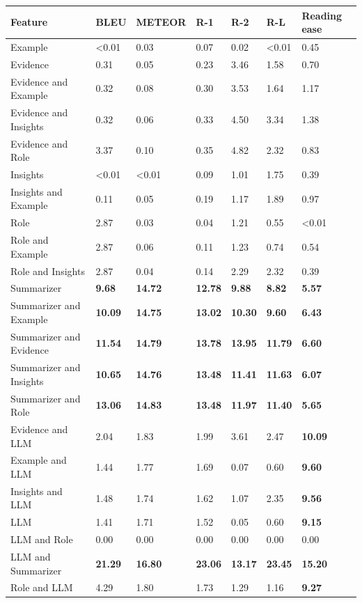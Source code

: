\begin{tabular}{|l|l|l|l|l|l|l|}
\hline
\textbf{Feature} & BLEU & METEOR & R-1 & R-2 & R-L & Reading ease \\
 \hline
 Example & \textless{}0.01 & 0.03 & 0.07 & 0.02 & \textless{}0.01 & 0.45 \\
 \hline
 Evidence & 0.31 & 0.05 & 0.23 & 3.46 & 1.58 & 0.70 \\
 \hline
 Evidence and Example & 0.32 & 0.08 & 0.30 & 3.53 & 1.64 & 1.17 \\
 \hline
 Evidence and Insights & 0.32 & 0.06 & 0.33 & 4.50 & 3.34 & 1.38 \\
 \hline
 Evidence and Role & 3.37 & 0.10 & 0.35 & 4.82 & 2.32 & 0.83 \\
 \hline
 Insights & \textless{}0.01 & \textless{}0.01 & 0.09 & 1.01 & 1.75 & 0.39 \\
 \hline
 Insights and Example & 0.11 & 0.05 & 0.19 & 1.17 & 1.89 & 0.97 \\
 \hline
 Role & 2.87 & 0.03 & 0.04 & 1.21 & 0.55 & \textless{}0.01 \\
 \hline
 Role and Example & 2.87 & 0.06 & 0.11 & 1.23 & 0.74 & 0.54 \\
 \hline
 Role and Insights & 2.87 & 0.04 & 0.14 & 2.29 & 2.32 & 0.39 \\
 \hline
 Summarizer & \textbf{9.68} & \textbf{14.72} & \textbf{12.78} & \textbf{9.88} & \textbf{8.82} & \textbf{5.57} \\
 \hline
 Summarizer and Example & \textbf{10.09} & \textbf{14.75} & \textbf{13.02} & \textbf{10.30} & \textbf{9.60} & \textbf{6.43} \\
 \hline
 Summarizer and Evidence & \textbf{11.54} & \textbf{14.79} & \textbf{13.78} & \textbf{13.95} & \textbf{11.79} & \textbf{6.60} \\
 \hline
 Summarizer and Insights & \textbf{10.65} & \textbf{14.76} & \textbf{13.48} & \textbf{11.41} & \textbf{11.63} & \textbf{6.07} \\
 \hline
 Summarizer and Role & \textbf{13.06} & \textbf{14.83} & \textbf{13.48} & \textbf{11.97} & \textbf{11.40} & \textbf{5.65} \\
 \hline
 Evidence and LLM & 2.04 & 1.83 & 1.99 & 3.61 & 2.47 & \textbf{10.09} \\
 \hline
 Example and LLM & 1.44 & 1.77 & 1.69 & 0.07 & 0.60 & \textbf{9.60} \\
 \hline
 Insights and LLM & 1.48 & 1.74 & 1.62 & 1.07 & 2.35 & \textbf{9.56} \\
 \hline
 LLM & 1.41 & 1.71 & 1.52 & 0.05 & 0.60 & \textbf{9.15} \\
 \hline
 LLM and Role & 0.00 & 0.00 & 0.00 & 0.00 & 0.00 & 0.00 \\
 \hline
 LLM and Summarizer & \textbf{21.29} & \textbf{16.80} & \textbf{23.06} & \textbf{13.17} & \textbf{23.45} & \textbf{15.20} \\
 \hline
 Role and LLM & 4.29 & 1.80 & 1.73 & 1.29 & 1.16 & \textbf{9.27} \\
\hline
\end{tabular}
